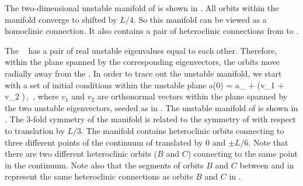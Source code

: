 The two-dimensional unstable manifold of  is shown in
.  All orbits within the manifold converge
to  shifted by $L/4$.  So this manifold can be viewed as a homoclinic
connection.  It also contains a pair of heteroclinic connections from
 to .

The \eqv\  has a pair of real unstable eigenvalues
equal to each other.  Therefore, within the plane spanned by the
corresponding eigenvectors, the orbits move radially away from
the \eqv.  In order to trace out the unstable manifold,
we start with a set of initial conditions within the unstable plane
\beq
 a(0) = a_{{}} + \epsilon(v_1 \cos \phi + v_2 \sin \phi)\,,
  \quad\phi\in[0,2\pi]\,,
\label{unsManSeed}
\eeq
where $v_1$ and $v_2$ are orthonormal vectors within the
plane spanned by the two unstable eigenvectors, seeded as in
.
  The unstable manifold
of  is shown in .  The 3-fold symmetry of
the manifold is related to the symmetry of  with respect to
translation by $L/3$.  The manifold contains heteroclinic orbits
connecting  to three different points of the continuum of {\eqva}
translated by 0 and $\pm L/6$.  Note that there are two different
heteroclinic orbits ($B$ and $C$) connecting  to the same point in the
 continuum.  Note also that the segments of orbits $B$ and $C$
between  and  in 
represent the same heteroclinic connections as orbits $B$ and $C$ in
.

